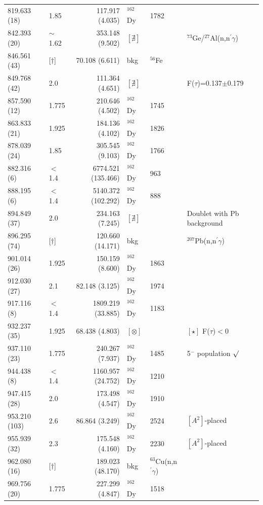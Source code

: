 \begin{landscape}
\begin{center}
\begin{longtable}{p{2.6cm}|p{1.2cm}|r|p{1.1cm}|p{2.0cm}|l}
   819.633 (18)  & 1.85       &117.917 (4.035)& $^{162}$Dy & 1782 & \\
   842.393 (20)  & $\sim$1.62 &353.148 (9.502)& $[\nexists]$ & & $^{73}$Ge/$^{27}$Al(n,n$^\prime\gamma$)\\
   846.561 (43)  & [$\dagger$]  & 70.108 (6.611)& bkg & $^{56}$Fe & \\
   849.768 (42)  & 2.0        &111.364 (4.651)& $[\nexists]$ & & F($\tau$)=0.137$\pm$0.179\\
   857.590 (12)  & 1.775      &210.646 (4.502)& $^{162}$Dy & 1745& \\
   863.833 (21)  & 1.925      & 184.136 (4.102)& $^{162}$Dy & 1826 & \\
   878.039 (24)  & 1.85       & 305.545 (9.103)& $^{162}$Dy & 1766 & \\
   882.316 (6)   & $<$1.4     &6774.521 (135.466)& $^{162}$Dy & 963 & \\
   888.195 (6)   & $<$1.4     &5140.372 (102.292)& $^{162}$Dy & 888 & \\
   894.849 (37)  & 2.0        &234.163 (7.245)& $[\nexists]$ & & Doublet with Pb background  \\
   896.295 (74)  & [$\dagger$]  &120.660 (14.171)& bkg & & $^{207}$Pb(n,n$^\prime\gamma$)\\
   901.014 (26)  & 1.925      &150.159 (8.600)& $^{162}$Dy & 1863 & \\
   912.030 (27)  & 2.1        &  82.148 (3.125)& $^{162}$Dy & 1974 & \\
   917.116 (8)   &$<$1.4      &1809.219 (33.885)& $^{162}$Dy & 1183 & \\
   932.237 (35)  & 1.925      & 68.438 (4.803)& $[\otimes]$ & & $[\star]$ F($\tau$)$<$0\\
   937.110 (23)  & 1.775      &240.267 (7.937)& $^{162}$Dy & 1485 & 5$^-$ population $\surd$ \\
   944.438 (8)   & $<$1.4     &1160.957 (24.752)& $^{162}$Dy & 1210 & \\
   947.415 (28)  & 2.0        &173.498 (4.547)& $^{162}$Dy & 1910 & \\
   953.210 (103) & 2.6        & 86.864 (3.249)& $^{162}$Dy & 2524 &$[A^2]$-placed\\
   955.939 (32)  & 2.3        &175.548 (4.160)& $^{162}$Dy & 2230 &$[A^2]$-placed \\
   962.080 (16)  & [$\dagger$]  &189.023 (48.170)& bkg & $^{63}$Cu(n,n$^\prime\gamma$) & \\
   969.756 (20)  & 1.775      &227.299 (4.847)& $^{162}$Dy & 1518 & \\

\end{longtable}
\end{center}
\end{landscape}
